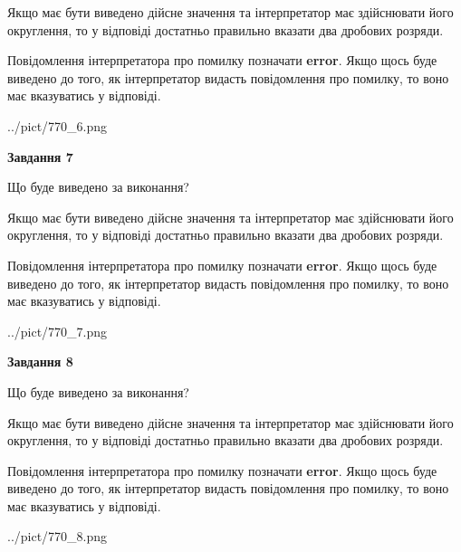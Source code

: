 \documentclass[12pt, ukrainian]{article}
\begin{document}
{\begin {Large}
Якщо має бути виведено дійсне значення та інтерпретатор має здійснювати його округлення, 
то у відповіді достатньо правильно вказати два дробових розряди.

Повідомлення інтерпретатора про помилку позначати \textbf{error}.
Якщо щось буде виведено до того, як інтерпретатор видасть повідомлення про помилку, 
то воно має вказуватись у відповіді. \par

\begin{center}
	{../pict/770_6.png}
\end{center}
\newpage

{\begin {center}\textbf{Завдання 7}\end {center}}\par
Що буде виведено за виконання? \par

Якщо має бути виведено дійсне значення та інтерпретатор має здійснювати його округлення, 
то у відповіді достатньо правильно вказати два дробових розряди.

Повідомлення інтерпретатора про помилку позначати \textbf{error}.
Якщо щось буде виведено до того, як інтерпретатор видасть повідомлення про помилку, 
то воно має вказуватись у відповіді. \par

\begin{center}
	{../pict/770_7.png}
\end{center}
\newpage

{\begin {center}\textbf{Завдання 8}\end {center}}\par
Що буде виведено за виконання? \par

Якщо має бути виведено дійсне значення та інтерпретатор має здійснювати його округлення, 
то у відповіді достатньо правильно вказати два дробових розряди.

Повідомлення інтерпретатора про помилку позначати \textbf{error}.
Якщо щось буде виведено до того, як інтерпретатор видасть повідомлення про помилку, 
то воно має вказуватись у відповіді. \par

\begin{center}
	{../pict/770_8.png}
\end{center}
\newpage


\end{Large}}
\end{document}
